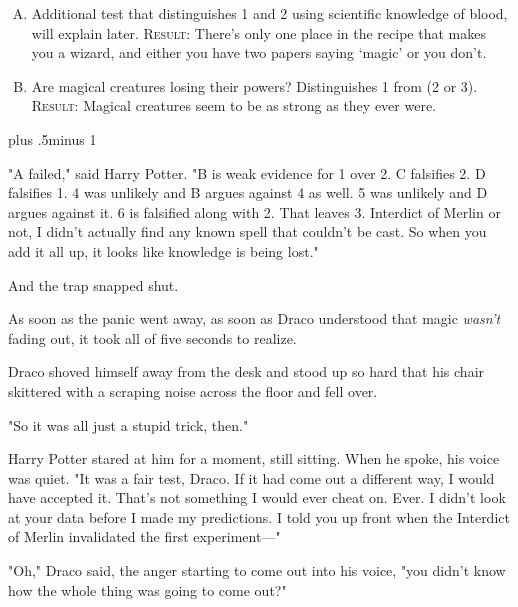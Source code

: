 \begin{centering}
\begin{samepage}
\begin{enumerate}[A.]{
                \firmlist
                \setlength{\leftmargin}{\parindent}
                \setlength{\rightmargin}{1cm}}
        \item Additional test that distinguishes 1 and 2 using scientific knowledge of blood, will explain later. {\scshape Result:} There's only one place in the recipe that makes you a wizard, and either you have two papers saying `magic' or you don't.

        \item Are magical creatures losing their powers? Distinguishes 1 from (2 or 3). {\scshape Result:} Magical creatures seem to be as strong as they ever were.
        \end{enumerate}
\end{samepage}
\end{centering}
\baselineskip plus .5\textheight minus 1\baselineskip
\restoretrivseps

"A failed," said Harry Potter. "B is weak evidence for 1 over 2. C falsifies 2.
D falsifies 1. 4 was unlikely and B argues against 4 as well. 5 was unlikely
and D argues against it. 6 is falsified along with 2. That leaves 3. Interdict
of Merlin or not, I didn't actually find any known spell that couldn't be cast.
So when you add it all up, it looks like knowledge is being lost."

And the trap snapped shut.

As soon as the panic went away, as soon as Draco understood that magic
\emph{wasn't} fading out, it took all of five seconds to realize.

Draco shoved himself away from the desk and stood up so hard that his chair
skittered with a scraping noise across the floor and fell over.

"So it was all just a stupid trick, then."

Harry Potter stared at him for a moment, still sitting. When he spoke, his
voice was quiet. "It was a fair test, Draco. If it had come out a different
way, I would have accepted it. That's not something I would ever cheat on.
Ever. I didn't look at your data before I made my predictions. I told you up
front when the Interdict of Merlin invalidated the first experiment---"

"Oh," Draco said, the anger starting to come out into his voice, "you didn't
know how the whole thing was going to come out?"

